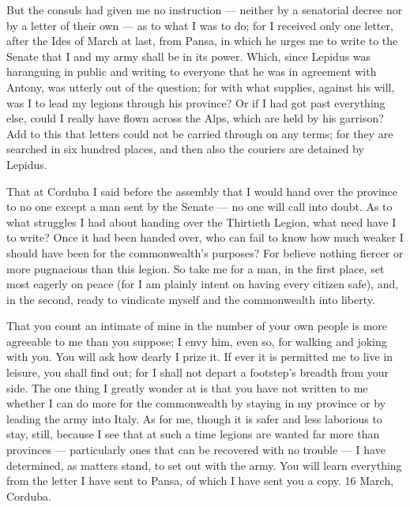  But the consuls had given me no instruction --- neither by a senatorial decree nor by a letter of their own --- as to what I was to do; for I received only one letter, after the Ides of March at last, from Pansa, in which he urges me to write to the Senate that I and my army shall be in its power. Which, since Lepidus was haranguing in public and writing to everyone that he was in agreement with Antony, was utterly out of the question; for with what supplies, against his will, was I to lead my legions through his province? Or if I had got past everything else, could I really have flown across the Alps, which are held by his garrison? Add to this that letters could not be carried through on any terms; for they are searched in six hundred places, and then also the couriers are detained by Lepidus.

 That at Corduba I said before the assembly that I would hand over the province to no one except a man sent by the Senate --- no one will call into doubt. As to what struggles I had about handing over the Thirtieth Legion, what need have I to write? Once it had been handed over, who can fail to know how much weaker I should have been for the commonwealth's purposes? For believe nothing fiercer or more pugnacious than this legion. So take me for a man, in the first place, set most eagerly on peace (for I am plainly intent on having every citizen safe), and, in the second, ready to vindicate myself and the commonwealth into liberty.

 That you count an intimate of mine in the number of your own people is more agreeable to me than you suppose; I envy him, even so, for walking and joking with you. You will ask how dearly I prize it. If ever it is permitted me to live in leisure, you shall find out; for I shall not depart a footstep's breadth from your side. The one thing I greatly wonder at is that you have not written to me whether I can do more for the commonwealth by staying in my province or by leading the army into Italy. As for me, though it is safer and less laborious to stay, still, because I see that at such a time legions are wanted far more than provinces --- particularly ones that can be recovered with no trouble --- I have determined, as matters stand, to set out with the army. You will learn everything from the letter I have sent to Pansa, of which I have sent you a copy. 16 March, Corduba.
